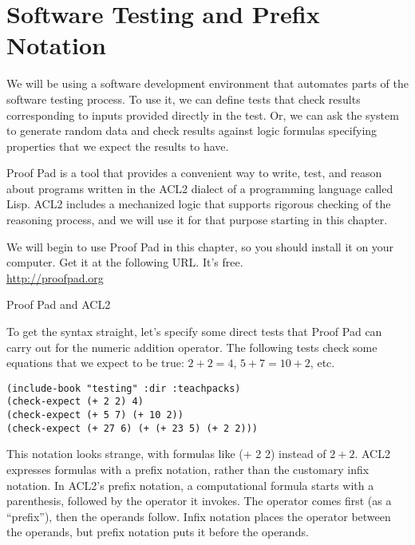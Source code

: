 \chapter{Software Testing and Prefix Notation}
\label{ch:software-testing-prefix-notation}


We will be using a software development environment that automates parts of the software testing process.
To use it, we can define tests that check results corresponding to inputs provided directly in the test.
Or, we can ask the system to generate random data and
check results against logic formulas specifying properties that we expect the results to have.

\begin{aside}
Proof Pad is a tool that provides a convenient way
to write, test, and reason about programs
written in the ACL2 dialect of a programming language called Lisp.
ACL2 includes a mechanized logic that
supports rigorous checking of the reasoning process,
and we will use it for that purpose starting in this chapter.

We will begin to use Proof Pad in this chapter,
so you should install it on your computer.
Get it at the following URL. It's free.\\
\hspace*{38mm}\url{http://proofpad.org}

\caption{Proof Pad and ACL2}
\label{aside:proof-pad}
\end{aside}

To get the syntax straight,
let's specify some direct tests that Proof Pad
can carry out for the numeric addition operator.
The following tests check some equations that we expect to be true:
$2 + 2 = 4$, $5 + 7 = 10 + 2$, etc.

\begin{Verbatim}
(include-book "testing" :dir :teachpacks)
(check-expect (+ 2 2) 4)
(check-expect (+ 5 7) (+ 10 2))
(check-expect (+ 27 6) (+ (+ 23 5) (+ 2 2)))
\end{Verbatim}

This notation looks strange, with formulas like \textsf{(+ 2 2)} instead of $2 + 2$.
ACL2 expresses formulas with a
prefix notation,
rather than the customary infix notation.
In ACL2's prefix notation, a computational
formula starts with a parenthesis,
followed by the operator it invokes.
The operator comes first (as a ``prefix''), then the operands follow.
Infix notation places the operator between the operands,
but prefix notation puts it before the operands.


